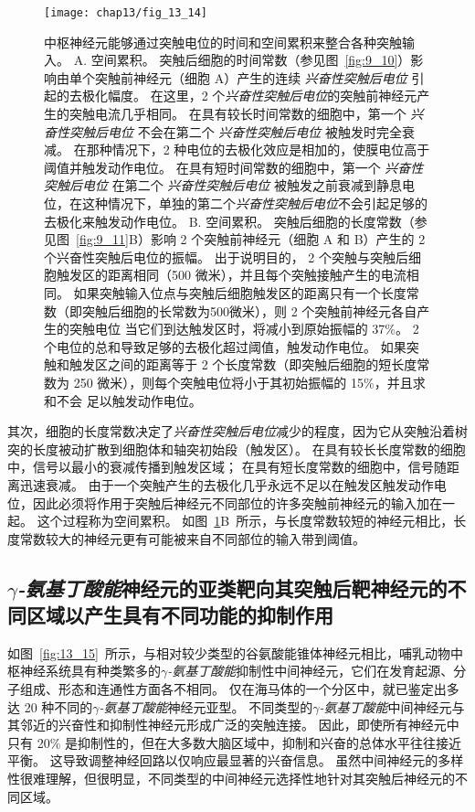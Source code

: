 \begin{figure}[htbp]
	\centering
	\texttt{[image: chap13/fig\_13\_14]}
	\caption{中枢神经元能够通过突触电位的时间和空间累积来整合各种突触输入。
		A. 空间累积。
		突触后细胞的时间常数（参见图~\ref{fig:9_10}）影响由单个突触前神经元（细胞 A）产生的连续 \textit{兴奋性突触后电位} 引起的去极化幅度。
		在这里，2 个\textit{兴奋性突触后电位}的突触前神经元产生的突触电流几乎相同。
		在具有较长时间常数的细胞中，第一个 \textit{兴奋性突触后电位} 不会在第二个 \textit{兴奋性突触后电位} 被触发时完全衰减。
		在那种情况下，2 种电位的去极化效应是相加的，使膜电位高于阈值并触发动作电位。
		在具有短时间常数的细胞中，第一个 \textit{兴奋性突触后电位} 在第二个 \textit{兴奋性突触后电位} 被触发之前衰减到静息电位，在这种情况下，单独的第二个\textit{兴奋性突触后电位}不会引起足够的去极化来触发动作电位。
		B. 空间累积。
		突触后细胞的长度常数（参见图~\ref{fig:9_11}B）影响 2 个突触前神经元（细胞 A 和 B）产生的 2 个兴奋性突触后电位的振幅。
		出于说明目的， 2 个突触与突触后细胞触发区的距离相同（500 微米），并且每个突触接触产生的电流相同。
		如果突触输入位点与突触后细胞触发区的距离只有一个长度常数（即突触后细胞的长常数为500微米），则 2 个突触前神经元各自产生的突触电位 当它们到达触发区时，将减小到原始振幅的 37\%。
		2 个电位的总和导致足够的去极化超过阈值，触发动作电位。
		如果突触和触发区之间的距离等于 2 个长度常数（即突触后细胞的短长度常数为 250 微米），则每个突触电位将小于其初始振幅的 15\%，并且求和不会 足以触发动作电位。}
	\label{fig:13_14}
\end{figure}


其次，细胞的长度常数决定了\textit{兴奋性突触后电位}减少的程度，因为它从突触沿着树突的长度被动扩散到细胞体和轴突初始段（触发区）。
在具有较长长度常数的细胞中，信号以最小的衰减传播到触发区域；
在具有短长度常数的细胞中，信号随距离迅速衰减。
由于一个突触产生的去极化几乎永远不足以在触发区触发动作电位，因此必须将作用于突触后神经元不同部位的许多突触前神经元的输入加在一起。
这个过程称为空间累积。
如图~\ref{fig:13_14}B~所示，与长度常数较短的神经元相比，长度常数较大的神经元更有可能被来自不同部位的输入带到阈值。



\subsection{\textit{$\gamma$-氨基丁酸能}神经元的亚类靶向其突触后靶神经元的不同区域以产生具有不同功能的抑制作用}

如图~\ref{fig:13_15}~所示，与相对较少类型的谷氨酸能锥体神经元相比，哺乳动物中枢神经系统具有种类繁多的\textit{$\gamma$-氨基丁酸能}抑制性中间神经元，它们在发育起源、分子组成、形态和连通性方面各不相同。
仅在海马体的一个分区中，就已鉴定出多达 20 种不同的\textit{$\gamma$-氨基丁酸能}神经元亚型。
不同类型的\textit{$\gamma$-氨基丁酸能}中间神经元与其邻近的兴奋性和抑制性神经元形成广泛的突触连接。
因此，即使所有神经元中只有 20\% 是抑制性的，但在大多数大脑区域中，抑制和兴奋的总体水平往往接近平衡。
这导致调整神经回路以仅响应最显著的兴奋信息。
虽然中间神经元的多样性很难理解，但很明显，不同类型的中间神经元选择性地针对其突触后神经元的不同区域。


